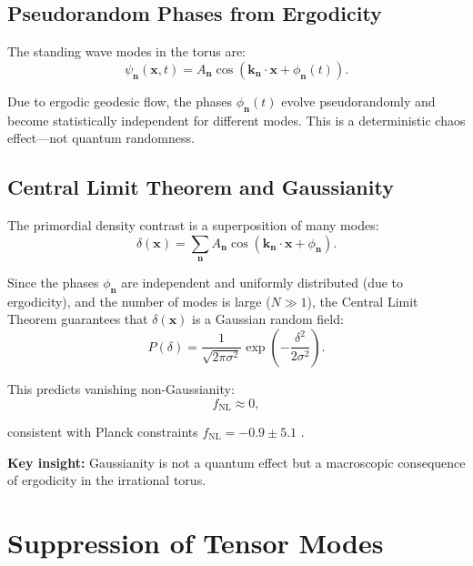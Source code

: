 \documentclass[12pt,a4paper]{article}
\begin{document}
\subsection{Pseudorandom Phases from Ergodicity}

The standing wave modes in the torus are:
\begin{equation}
\psi_{\mathbf{n}}(\mathbf{x}, t) = A_{\mathbf{n}} \cos(\mathbf{k}_{\mathbf{n}} \cdot \mathbf{x} + \phi_{\mathbf{n}}(t)).
\end{equation}

Due to ergodic geodesic flow, the phases $\phi_{\mathbf{n}}(t)$ evolve pseudorandomly and become statistically independent for different modes. This is a deterministic chaos effect---not quantum randomness.

\subsection{Central Limit Theorem and Gaussianity}

The primordial density contrast is a superposition of many modes:
\begin{equation}
\delta(\mathbf{x}) = \sum_{\mathbf{n}} A_{\mathbf{n}} \cos(\mathbf{k}_{\mathbf{n}} \cdot \mathbf{x} + \phi_{\mathbf{n}}).
\end{equation}

Since the phases $\phi_{\mathbf{n}}$ are independent and uniformly distributed (due to ergodicity), and the number of modes is large ($N \gg 1$), the Central Limit Theorem guarantees that $\delta(\mathbf{x})$ is a Gaussian random field:
\begin{equation}
P(\delta) = \frac{1}{\sqrt{2\pi \sigma^2}} \exp\left(-\frac{\delta^2}{2\sigma^2}\right).
\end{equation}

This predicts vanishing non-Gaussianity:
\begin{equation}
f_{\mathrm{NL}} \approx 0,
\end{equation}

consistent with Planck constraints $f_{\mathrm{NL}} = -0.9 \pm 5.1$ \citep{Planck2020}.

\textbf{Key insight:} Gaussianity is not a quantum effect but a macroscopic consequence of ergodicity in the irrational torus.

\section{Suppression of Tensor Modes}
\end{document}
